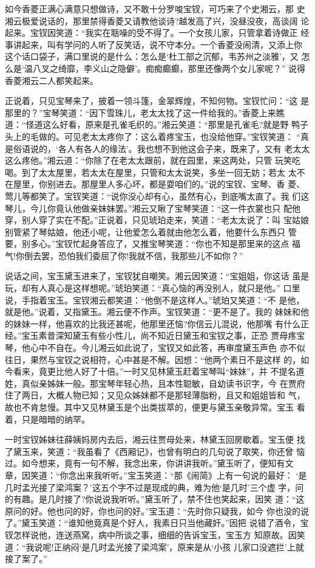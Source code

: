 如今香菱正满心满意只想做诗，又不敢十分罗唆宝钗，可巧来了个史湘云，那
史湘云极爱说话的，那里禁得香菱又请教他谈诗?越发高了兴，没昼没夜，高谈阔
论起来。宝钗因笑道：“我实在聒噪的受不得了。一个女孩儿家，只管拿着诗做正
经事讲起来，叫有学问的人听了反笑话，说不守本分。一个香菱没闹清，又添上你
这个话口袋子，满口里说的是什么：怎么是‘杜工部之沉郁，韦苏州之淡雅’，又
怎么是‘温八叉之绮靡，李义山之隐僻’。痴痴癫癫，那里还像两个女儿家呢？”
说得香菱湘云二人都笑起来。

正说着，只见宝琴来了，披着一领斗篷，金翠辉煌，不知何物。宝钗忙问：“这
是那里的？”宝琴笑道：“因下雪珠儿，老太太找了这一件给我的。”香菱上来瞧
道：“怪道这么好看，原来是孔雀毛织的。”湘云笑道：“那里是孔雀毛?就是野
鸭子头上的毛做的。可见老太太疼你了：这么着疼宝玉，也没给他穿。”宝钗笑道：
“真是俗语说的，‘各人有各人的缘法’。我也想不到他这会子来，既来了，又有
老太太这么疼他。”湘云道：“你除了在老太太跟前，就在园里，来这两处，只管
玩笑吃喝。到了太太屋里，若太太在屋里，只管和太太说笑，多坐一回无妨；若太
太不在屋里，你别进去。那屋里人多心坏，都是耍咱们的。”说的宝钗、宝琴、香
菱、莺儿等都笑了。宝钗笑道：“说你没心却有心，虽然有心，到底嘴太直了。我
们这琴儿，今儿你竟认他做亲妹妹罢。”湘云又瞅了宝琴笑道：“这一件衣裳也只
配他穿，别人穿了实在不配。”正说着，只见琥珀走来，笑道：“老太太说了：叫
宝姑娘别管紧了琴姑娘，他还小呢，让他爱怎么着就由他怎么着，他要什么东西只
管要，别多心。”宝钗忙起身答应了，又推宝琴笑道：“你也不知是那里来的这点
福气!你倒去罢，恐怕我们委屈了你!我就不信，我那些儿不如你？”

说话之间，宝玉黛玉进来了，宝钗犹自嘲笑。湘云因笑道：“宝姐姐，你这话
虽是玩，却有人真心是这样想呢。”琥珀笑道：“真心恼的再没别人，就只是他。”
口里说，手指着宝玉。宝钗湘云都笑道：“他倒不是这样人。”琥珀又笑道：“不
是他，就是他。”说着，又指黛玉。湘云便不作声。宝钗笑道：“更不是了。我的
妹妹和他的妹妹一样，他喜欢的比我还甚呢，他那里还恼?你信云儿混说，他那嘴
有什么正经。”宝玉素昔深知黛玉有些小性儿，尚不知近日黛玉和宝钗之事，正恐
贾母疼宝琴，他心中不自在。今儿湘云如此说了，宝钗又如此答，再审度黛玉声色
亦不似往日，果然与宝钗之说相符，心中甚是不解。因想：“他两个素日不是这样
的，如今看来，竟更比他人好了十倍。”一时又见林黛玉赶着宝琴叫“妹妹”，并
不提名道姓，真似亲姊妹一般。那宝琴年轻心热，且本性聪敏，自幼读书识字，今
在贾府住了两日，大概人物已知；又见众姊妹都不是那轻薄脂粉，且又和姐姐皆和
气，故也不肯怠慢。其中又见林黛玉是个出类拔萃的，便更与黛玉亲敬异常。宝玉
看着，只是暗暗的纳罕。

一时宝钗姊妹往薛姨妈房内去后，湘云往贾母处来，林黛玉回房歇着。宝玉便
找了黛玉来，笑道：“我虽看了《西厢记》，也曾有明白的几句说了取笑，你还曾
恼过。如今想来，竟有一句不解，我念出来，你讲讲我听。”黛玉听了，便知有文
章，因笑道：“你念出来我听听。”宝玉笑道：“那《闹简》上有一句说的最好：
‘是几时孟光接了梁鸿案？’这五个字不过是现成的典，难为他‘是几时’三个虚
字，问的有趣。是几时接了?你说说我听听。”黛玉听了，禁不住也笑起来，因笑
道：“这原问的好。他也问的好，你也问的好。”宝玉道：“先时你只疑我，如今
你也没的说了。”黛玉笑道：“谁知他竟真是个好人，我素日只当他藏奸。”因把
说错了酒令，宝钗怎样说他，连送燕窝，病中所谈之事，细细的告诉宝玉，宝玉方
知原故。因笑道：“我说呢!正纳闷‘是几时孟光接了梁鸿案’，原来是从‘小孩
儿家口没遮拦’上就接了案了。”

